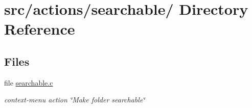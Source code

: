 \hypertarget{dir_000039}{
\section{src/actions/searchable/ Directory Reference}
\label{dir_000039}
}
\subsection*{Files}
\begin{CompactItemize}
\item 
file \hyperlink{searchable_8c}{searchable.c}
\begin{CompactList}\small\item\em context-menu action \char`\"{}Make folder searchable\char`\"{} \item\end{CompactList}

\end{CompactItemize}
